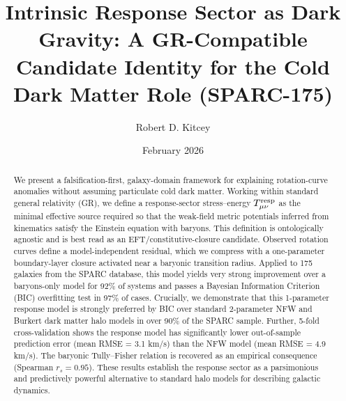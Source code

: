 \documentclass[12pt,onecolumn]{aastex631}
\newcommand{\tresp}{T^{\rm resp}_{\mu\nu}}
\begin{document}
\title{Intrinsic Response Sector as Dark Gravity: A GR-Compatible Candidate Identity for the Cold Dark Matter Role (SPARC-175)}

\author[0009-0004-8679-9155]{Robert D. Kitcey}

\date{February 2026}

\begin{abstract}
We present a falsification-first, galaxy-domain framework for explaining rotation-curve anomalies without assuming particulate cold dark matter. Working within standard general relativity (GR), we define a response-sector stress–energy \(\tresp\) as the minimal effective source required so that the weak-field metric potentials inferred from kinematics satisfy the Einstein equation with baryons. This definition is ontologically agnostic and is best read as an EFT/constitutive-closure candidate. Observed rotation curves define a model-independent residual, which we compress with a one-parameter boundary-layer closure activated near a baryonic transition radius. Applied to 175 galaxies from the SPARC database, this model yields very strong improvement over a baryons-only model for 92\% of systems and passes a Bayesian Information Criterion (BIC) overfitting test in 97\% of cases. Crucially, we demonstrate that this 1-parameter response model is strongly preferred by BIC over standard 2-parameter NFW and Burkert dark matter halo models in over 90\% of the SPARC sample. Further, 5-fold cross-validation shows the response model has significantly lower out-of-sample prediction error (mean RMSE = 3.1 km/s) than the NFW model (mean RMSE = 4.9 km/s). The baryonic Tully–Fisher relation is recovered as an empirical consequence (Spearman \(r_s = 0.95\)). These results establish the response sector as a parsimonious and predictively powerful alternative to standard halo models for describing galactic dynamics.
\end{abstract}

\end{document}
